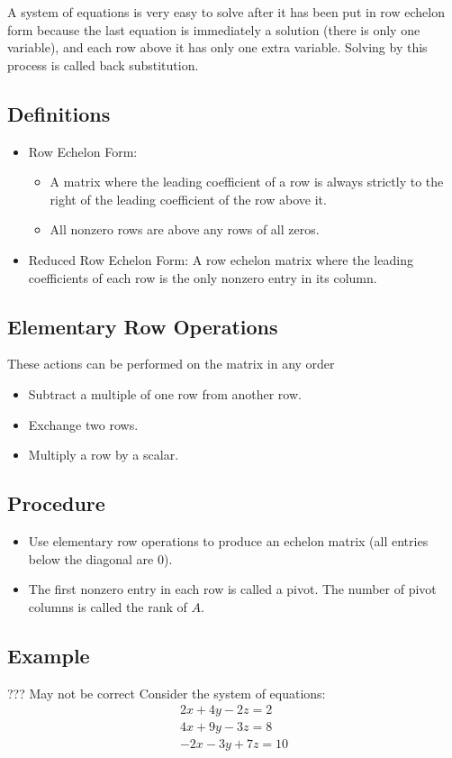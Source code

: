 \documentclass[12pt]{article}
\begin{document}
A system of equations is very easy to solve after it has been put in row echelon form because the last equation is immediately a solution (there is only one variable), and each row above it has only one extra variable.  Solving by this process is called back substitution.

\subsection{Definitions}
\begin{itemize}
\item Row Echelon Form:
	\begin{itemize}
	\item A matrix where the leading coefficient of a row is always strictly to the right of the leading coefficient of the row above it.
	\item All nonzero rows are above any rows of all zeros.
	\end{itemize}
\item Reduced Row Echelon Form: A row echelon matrix where the leading coefficients of each row is the only nonzero entry in its column.
\end{itemize}


\subsection{Elementary Row Operations}
These actions can be performed on the matrix in any order
\begin{itemize}
\item Subtract a multiple of one row from another row.
\item Exchange two rows.
\item Multiply a row by a scalar.
\end{itemize}


\subsection{Procedure}
\begin{itemize}
\item Use elementary row operations to produce an echelon matrix (all entries below the diagonal are 0).
\item The first nonzero entry in each row is called a pivot. The number of pivot columns is called the rank of $A$.
\end{itemize}

\subsection{Example}
??? May not be correct
Consider the system of equations:
\begin{align*}
2x + 4y - 2z = 2\\
4x + 9y - 3z = 8\\
-2x - 3y + 7z = 10
\end{align*}
\end{document}

